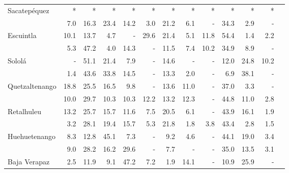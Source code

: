\begin{landscape}
\begin{center}
\begin{longtable}{lrrrrrrrrrrrr}
			\multicolumn{1}{l}{	Sacatepéquez	}&	*	&	*	&	*	&	*	&	*	&	*	&	*	&	*	&	*	&	*	&	*	\\
			\rowcolor{color1!5!white}\multicolumn{1}{l}{	Chimaltenango	}&	 7.0 	 & 	 16.3 	 & 	 23.4 	 & 	 14.2 	 & 	 3.0 	 & 	 21.2 	 & 	 6.1 	 & 	 -   	 & 	 34.3 	 & 	 2.9 	 & 	 -   	 \\ 
			\multicolumn{1}{l}{	Escuintla	}&	 10.1 	 & 	 13.7 	 & 	 4.7 	 & 	 -   	 & 	 29.6 	 & 	 21.4 	 & 	 5.1 	 & 	 11.8 	 & 	 54.4 	 & 	 1.4 	 & 	 2.2 	 \\ 
			\rowcolor{color1!5!white}\multicolumn{1}{l}{	Santa Rosa	}&	 5.3 	 & 	 47.2 	 & 	 4.0 	 & 	 14.3 	 & 	 -   	 & 	 11.5 	 & 	 7.4 	 & 	 10.2 	 & 	 34.9 	 & 	 8.9 	 & 	 -   	 \\ 
			\multicolumn{1}{l}{	Sololá	}&	 -   	 & 	 51.1 	 & 	 21.4 	 & 	 7.9 	 & 	 -   	 & 	 14.6 	 & 	 -   	 & 	 -   	 & 	 12.0 	 & 	 24.8 	 & 	 10.2 	 \\ 
			\rowcolor{color1!5!white}\multicolumn{1}{l}{	Totonicapán	}&	 1.4 	 & 	 43.6 	 & 	 33.8 	 & 	 14.5 	 & 	 -   	 & 	 13.3 	 & 	 2.0 	 & 	 -   	 & 	 6.9 	 & 	 38.1 	 & 	 -   	 \\ 
			\multicolumn{1}{l}{	Quetzaltenango	}&	 18.8 	 & 	 25.5 	 & 	 16.5 	 & 	 9.8 	 & 	 -   	 & 	 13.6 	 & 	 11.0 	 & 	 -   	 & 	 37.0 	 & 	 3.3 	 & 	 -   	 \\ 
			\rowcolor{color1!5!white}\multicolumn{1}{l}{	Suchitepéquez	}&	 10.0 	 & 	 29.7 	 & 	 10.3 	 & 	 10.3 	 & 	 12.2 	 & 	 13.2 	 & 	 12.3 	 & 	 -   	 & 	 44.8 	 & 	 11.0 	 & 	 2.8 	 \\ 
			\multicolumn{1}{l}{	Retalhuleu	}&	 13.2 	 & 	 25.7 	 & 	 15.7 	 & 	 11.6 	 & 	 7.5 	 & 	 20.5 	 & 	 6.1 	 & 	 -   	 & 	 43.9 	 & 	 16.1 	 & 	 1.9 	 \\ 
			\rowcolor{color1!5!white}\multicolumn{1}{l}{	San Marcos	}&	 3.2 	 & 	 28.1 	 & 	 19.4 	 & 	 15.7 	 & 	 5.3 	 & 	 21.8 	 & 	 1.8 	 & 	 3.8 	 & 	 43.4 	 & 	 2.8 	 & 	 1.5 	 \\ 
			\multicolumn{1}{l}{	Huehuetenango	}&	 8.3 	 & 	 12.8 	 & 	 45.1 	 & 	 7.3 	 & 	 -   	 & 	 9.2 	 & 	 4.6 	 & 	 -   	 & 	 44.1 	 & 	 19.0 	 & 	 3.4 	 \\ 
			\rowcolor{color1!5!white}\multicolumn{1}{l}{	Quiché	}&	 9.0 	 & 	 28.2 	 & 	 16.2 	 & 	 29.6 	 & 	 -   	 & 	 7.7 	 & 	 -   	 & 	 -   	 & 	 35.0 	 & 	 13.5 	 & 	 3.1 	 \\ 
			\multicolumn{1}{l}{	Baja Verapaz	}&	 2.5 	 & 	 11.9 	 & 	 9.1 	 & 	 47.2 	 & 	 7.2 	 & 	 1.9 	 & 	 14.1 	 & 	 -   	 & 	 10.9 	 & 	 25.9 	 & 	 -   	 \\ 

\end{longtable}
\end{center}
\end{landscape}
